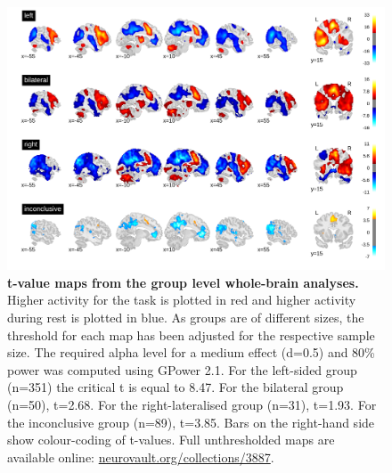 \documentclass[fleqn,10pt]{SelfArx} %
\begin{document}
\begin{figure}[!htb]
	\begin{minipage}{\textwidth}
		\renewcommand{\familydefault}{\sfdefault}\normalfont
		\centering
		\includegraphics[width=0.8\columnwidth]{../reports/figures/03-group-maps.png}
		\vspace*{-3mm}
		\caption{\textbf{t-value maps from the group level whole-brain analyses.} Higher activity for the task is plotted in red and higher activity during rest is plotted in blue. As groups are of different sizes, the threshold for each map has been adjusted for the respective sample size. The required alpha level for a medium effect (d=0.5) and 80\% power was computed using GPower 2.1. For the left-sided group (n=351) the critical t is equal to 8.47. For the bilateral group (n=50), t=2.68. For the right-lateralised group (n=31), t=1.93. For the inconclusive group (n=89), t=3.85. Bars on the right-hand side show colour-coding of t-values. Full unthresholded maps are available online: \href{https://neurovault.org/collections/3887}{neurovault.org/collections/3887}.}%
		\label{fig:group}
	\end{minipage}
\end{figure}
\end{document}
